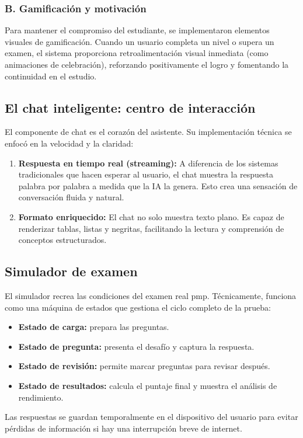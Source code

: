 \subsubsection{B. Gamificación y motivación}
Para mantener el compromiso del estudiante, se implementaron elementos visuales de gamificación. Cuando un usuario completa un nivel o supera un examen, el sistema proporciona retroalimentación visual inmediata (como animaciones de celebración), reforzando positivamente el logro y fomentando la continuidad en el estudio.

\subsection{El chat inteligente: centro de interacción}
El componente de chat es el corazón del asistente. Su implementación técnica se enfocó en la velocidad y la claridad:
\begin{enumerate}
\item \textbf{Respuesta en tiempo real (streaming):} A diferencia de los sistemas tradicionales que hacen esperar al usuario, el chat muestra la respuesta palabra por palabra a medida que la IA la genera. Esto crea una sensación de conversación fluida y natural.
\item \textbf{Formato enriquecido:} El chat no solo muestra texto plano. Es capaz de renderizar tablas, listas y negritas, facilitando la lectura y comprensión de conceptos estructurados.
\end{enumerate}

\subsection{Simulador de examen}
El simulador recrea las condiciones del examen real \gls{pmp}. Técnicamente, funciona como una máquina de estados que gestiona el ciclo completo de la prueba:
\begin{itemize}
\item \textbf{Estado de carga:} prepara las preguntas.
\item \textbf{Estado de pregunta:} presenta el desafío y captura la respuesta.
\item \textbf{Estado de revisión:} permite marcar preguntas para revisar después.
\item \textbf{Estado de resultados:} calcula el puntaje final y muestra el análisis de rendimiento.
\end{itemize}
Las respuestas se guardan temporalmente en el dispositivo del usuario para evitar pérdidas de información si hay una interrupción breve de internet.

